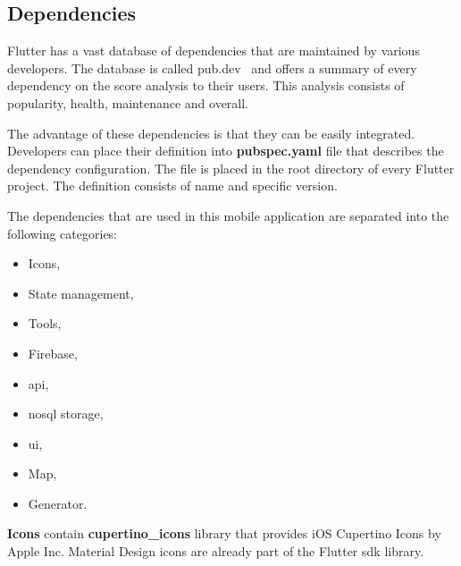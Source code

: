 \subsection{Dependencies}\label{subsec:dependencies}
Flutter has a vast database of dependencies that are maintained by various developers.
The database is called pub.dev~\cite{pubDev} and offers a summary of every dependency on the score analysis to their users.
This analysis consists of popularity, health, maintenance and overall.

The advantage of these dependencies is that they can be easily integrated.
Developers can place their definition into \textbf{pubspec.yaml} file that describes the dependency configuration.
The file is placed in the root directory of every Flutter project.
The definition consists of name and specific version.

The dependencies that are used in this mobile application are separated into the following categories:
\begin{itemize}
    \item Icons,
    \item State management,
    \item Tools,
    \item Firebase,
    \item \acrshort{api},
    \item \acrshort{nosql} storage,
    \item \acrshort{ui},
    \item Map,
    \item Generator.
\end{itemize}

\textbf{Icons} contain \textbf{cupertino\_icons} library that provides iOS Cupertino Icons by Apple Inc.
Material Design icons are already part of the Flutter \acrshort{sdk} library.


